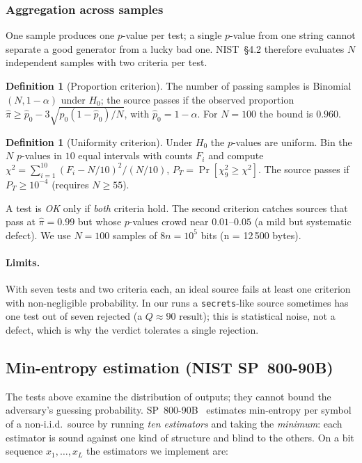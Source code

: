 \documentclass[11pt,a4paper]{article}
\theoremstyle{plain}
\theoremstyle{definition}
\newtheorem{definition}[theorem]{Definition}
\begin{document}
\subsubsection{Aggregation across samples}

One sample produces one $p$-value per test; a single $p$-value from one string
cannot separate a good generator from a lucky bad one. NIST~\S4.2 therefore
evaluates $N$ independent samples with two criteria per test.

\begin{definition}[Proportion criterion]
The number of passing samples is Binomial$(N,1-\alpha)$ under $H_0$; the source
passes if the observed proportion $\hat\pi\ge\hat p_0-3\sqrt{\hat p_0(1-\hat p_0)/N}$,
with $\hat p_0=1-\alpha$. For $N=100$ the bound is $0.960$.
\end{definition}

\begin{definition}[Uniformity criterion]
Under $H_0$ the $p$-values are uniform. Bin the $N$ $p$-values in $10$ equal
intervals with counts $F_i$ and compute
$\chi^2=\sum_{i=1}^{10}(F_i-N/10)^2/(N/10)$, $P_T=\Pr[\chi^2_9\ge\chi^2]$.
The source passes if $P_T\ge10^{-4}$ (requires $N\ge55$).
\end{definition}

A test is \emph{OK} only if \emph{both} criteria hold. The second criterion
catches sources that pass at $\hat\pi=0.99$ but whose $p$-values crowd near
$0.01$--$0.05$ (a mild but systematic defect). We use $N=100$ samples of
$8n=10^5$ bits (n = 12\,500 bytes).

\paragraph{Limits.} With seven tests and two criteria each, an ideal source
fails at least one criterion with non-negligible probability. In our runs a
\texttt{secrets}-like source sometimes has one test out of seven rejected
(a $Q\approx90$ result); this is statistical noise, not a defect, which is why
the verdict tolerates a single rejection.

\subsection{Min-entropy estimation (NIST SP~800-90B)}\label{sec:90b}

The tests above examine the distribution of outputs; they cannot bound the
adversary's guessing probability. SP~800-90B~\cite{sp90b} estimates min-entropy
per symbol of a non-i.i.d.\ source by running \emph{ten estimators} and
taking the \emph{minimum}: each estimator is sound against one kind of
structure and blind to the others. On a bit sequence $x_1,\dots,x_L$ the
estimators we implement are:
\end{document}

